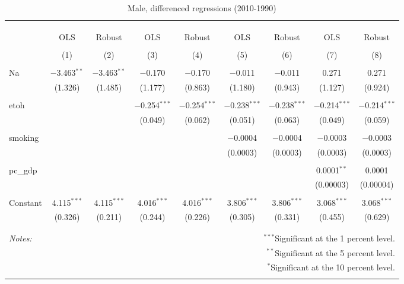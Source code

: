 \documentclass[11pt]{article}\usepackage[]{graphicx}\usepackage[]{color}
\begin{document}
\begin{table}[!htbp] \centering 
  \caption{Male, differenced regressions (2010-1990)} 
  \label{tab:mlm} 
\begin{tabular}{@{\extracolsep{5pt}}lcccccccc} 
\\[-1.8ex]\hline 
\hline \\[-1.8ex] 
\\[-1.8ex] & \multicolumn{8}{c}{ } \\ 
 & OLS & Robust & OLS & Robust & OLS & Robust & OLS & Robust \\ 
\\[-1.8ex] & (1) & (2) & (3) & (4) & (5) & (6) & (7) & (8)\\ 
\hline \\[-1.8ex] 
 Na & $-$3.463$^{**}$ & $-$3.463$^{**}$ & $-$0.170 & $-$0.170 & $-$0.011 & $-$0.011 & 0.271 & 0.271 \\ 
  & (1.326) & (1.485) & (1.177) & (0.863) & (1.180) & (0.943) & (1.127) & (0.924) \\ 
  & & & & & & & & \\ 
 etoh &  &  & $-$0.254$^{***}$ & $-$0.254$^{***}$ & $-$0.238$^{***}$ & $-$0.238$^{***}$ & $-$0.214$^{***}$ & $-$0.214$^{***}$ \\ 
  &  &  & (0.049) & (0.062) & (0.051) & (0.063) & (0.049) & (0.059) \\ 
  & & & & & & & & \\ 
 smoking &  &  &  &  & $-$0.0004 & $-$0.0004 & $-$0.0003 & $-$0.0003 \\ 
  &  &  &  &  & (0.0003) & (0.0003) & (0.0003) & (0.0003) \\ 
  & & & & & & & & \\ 
 pc\_gdp &  &  &  &  &  &  & 0.0001$^{**}$ & 0.0001 \\ 
  &  &  &  &  &  &  & (0.00003) & (0.00004) \\ 
  & & & & & & & & \\ 
 Constant & 4.115$^{***}$ & 4.115$^{***}$ & 4.016$^{***}$ & 4.016$^{***}$ & 3.806$^{***}$ & 3.806$^{***}$ & 3.068$^{***}$ & 3.068$^{***}$ \\ 
  & (0.326) & (0.211) & (0.244) & (0.226) & (0.305) & (0.331) & (0.455) & (0.629) \\ 
  & & & & & & & & \\ 
\hline 
\hline \\[-1.8ex] 
\textit{Notes:} & \multicolumn{8}{r}{$^{***}$Significant at the 1 percent level.} \\ 
 & \multicolumn{8}{r}{$^{**}$Significant at the 5 percent level.} \\ 
 & \multicolumn{8}{r}{$^{*}$Significant at the 10 percent level.} \\ 
 & \multicolumn{8}{r}{} \\ 
\end{tabular} 
\end{table} 
\end{document}
